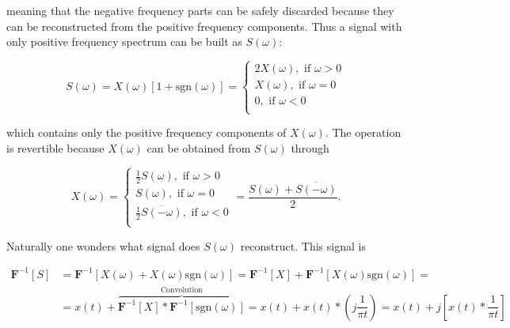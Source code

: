 	\noindent meaning that the negative frequency parts can be safely discarded because they can be reconstructed from the positive frequency components. Thus a signal with only positive frequency spectrum can be built as $S\left(\omega\right)$:

\begin{equation} S\left(\omega\right) = X\left(\omega\right) \left[ 1 + \text{sgn}\left(\omega\right)\right] = \left\{\begin{array}{l} 2X\left(\omega\right), \text{ if } \omega > 0 \\[3mm] X\left(\omega\right), \text{ if } \omega = 0 \\[3mm] 0, \text{ if } \omega < 0 \\[3mm]\end{array}\right. \end{equation}

	\noindent which contains only the positive frequency components of $X\left(\omega\right)$. The operation is revertible because $X\left(\omega\right)$ can be obtained from $S\left(\omega\right)$ through

\begin{equation} X\left(\omega\right) = \left\{\begin{array}{l} \frac{1}{2} S\left(\omega\right), \text{ if } \omega > 0 \\[3mm] S\left(\omega\right), \text{ if } \omega = 0 \\[3mm] \frac{1}{2}\overline{ S\left(-\omega\right)}, \text{ if } \omega < 0 \\[3mm]\end{array}\right. = \dfrac{ S\left(\omega\right) + \overline{S\left(-\omega\right)} }{2} .\end{equation}

	Naturally one wonders what signal does $S\left(\omega\right)$ reconstruct. This signal is

\begin{align} \mathbf{F}^{-1}\left[S\right] &= \mathbf{F}^{-1}\left[X\left(\omega\right) + X\left(\omega\right) \text{sgn}\left(\omega\right)\right] = \mathbf{F}^{-1}\left[X\right] + \mathbf{F}^{-1}\left[X\left(\omega\right) \text{sgn}\left(\omega\right)\right] = \nonumber\\[3mm] &= x(t) + \overbrace{\mathbf{F}^{-1}\left[X\right] * \mathbf{F}^{-1}\left[\text{sgn}\left(\omega\right)\right]}^{\text{Convolution}} = x(t) + x(t) * \left(j\dfrac{1}{\pi t} \right) = x(t) + j \left[x(t) * \dfrac{1}{\pi t}\right]\end{align}

